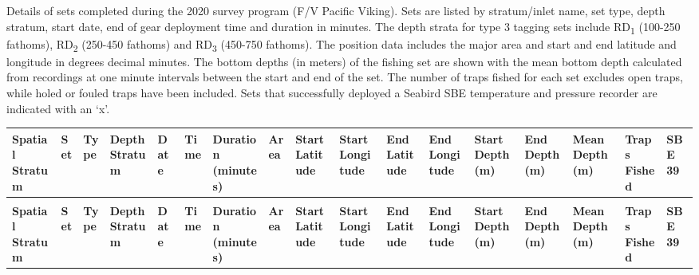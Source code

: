 \documentclass[12pt]{article}\usepackage[]{graphicx}\usepackage[]{color}
\begin{document}
\begin{appendices}
Details of sets completed during the 2020 survey program (F/V Pacific Viking). Sets are listed by stratum/inlet name, set type, depth stratum, start date, end of gear deployment time and duration in minutes. The depth strata for type 3 tagging sets include RD\textsubscript{1} (100-250 fathoms), RD\textsubscript{2} (250-450 fathoms) and RD\textsubscript{3} (450-750 fathoms). The position data includes the major area and start and end latitude and longitude in degrees decimal minutes. The bottom depths (in meters) of the fishing set are shown with the mean bottom depth calculated from recordings at one minute intervals between the start and end of the set. The number of traps fished for each set excludes open traps, while holed or fouled traps have been included. Sets that successfully deployed a Seabird SBE temperature and pressure recorder are indicated with an `x'.
\begin{landscape}\begingroup\fontsize{8}{10}\selectfont
\begin{longtable}{>{\raggedright\arraybackslash}p{0.7cm}>{\raggedleft\arraybackslash}p{0.5cm}>{\raggedright\arraybackslash}p{0.4cm}>{\raggedright\arraybackslash}p{0.7cm}>{\raggedright\arraybackslash}p{0.9cm}>{\raggedright\arraybackslash}p{0.6cm}>{\raggedleft\arraybackslash}p{0.9cm}>{\raggedright\arraybackslash}p{0.5cm}>{\raggedright\arraybackslash}p{1.2cm}>{\raggedright\arraybackslash}p{1.7cm}>{\raggedright\arraybackslash}p{1.2cm}>{\raggedright\arraybackslash}p{1.7cm}>{\raggedleft\arraybackslash}p{0.7cm}>{\raggedleft\arraybackslash}p{0.7cm}>{\raggedleft\arraybackslash}p{0.5cm}>{\raggedleft\arraybackslash}p{0.6cm}>{\raggedright\arraybackslash}p{0.4cm}}
\toprule
\textbf{Spatial Stratum} & \textbf{Set} & \textbf{Type} & \textbf{Depth Stratum} & \textbf{Date} & \textbf{Time} & \textbf{Duration (minutes)} & \textbf{Area} & \textbf{Start Latitude} & \textbf{Start Longitude} & \textbf{End Latitude} & \textbf{End Longitude} & \textbf{Start Depth (m)} & \textbf{End Depth (m)} & \textbf{Mean Depth (m)} & \textbf{Traps Fished} & \textbf{SBE 39}\\
\midrule
\endfirsthead
\multicolumn{17}{@{}l}{continued.}\\
\toprule
\textbf{Spatial Stratum} & \textbf{Set} & \textbf{Type} & \textbf{Depth Stratum} & \textbf{Date} & \textbf{Time} & \textbf{Duration (minutes)} & \textbf{Area} & \textbf{Start Latitude} & \textbf{Start Longitude} & \textbf{End Latitude} & \textbf{End Longitude} & \textbf{Start Depth (m)} & \textbf{End Depth (m)} & \textbf{Mean Depth (m)} & \textbf{Traps Fished} & \textbf{SBE 39}\\
\midrule
\endhead


\end{longtable}
\end{landscape}
\end{appendices}
\end{document}
